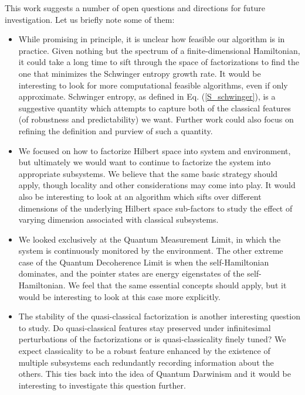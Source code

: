 \documentclass[aps,pra,onecolumn,nofootinbib,11pt,tightenlines]{revtex4-1}
\begin{document}
This work suggests a number of open questions and directions for future investigation.
Let us briefly note some of them:
\begin{itemize}
\item{While promising in principle, it is unclear how feasible our algorithm is in practice. Given nothing but the spectrum of a finite-dimensional Hamiltonian, it could take a long time to sift through the space of factorizations to find the one that minimizes the Schwinger entropy growth rate. It would be interesting to look for more computational feasible algorithms, even if only approximate. Schwinger entropy, as defined in Eq. (\ref{S_schwinger}), is a suggestive quantity which attempts to capture both of the classical features (of robustness and predictability) we want. Further work could also focus on refining the definition and purview of such a quantity.}
\item{We focused on how to factorize Hilbert space into system and environment, but ultimately we would want to continue to factorize the system into appropriate subsystems. We believe that the same basic strategy should apply, though locality and other considerations may come into play. It would also be interesting to look at an algorithm which sifts over different dimensions of the underlying Hilbert space sub-factors to study the effect of varying dimension associated with classical subsystems.}
\item{We looked exclusively at the Quantum Measurement Limit, in which the system is continuously monitored by the environment. The other extreme case of the Quantum Decoherence Limit is when the self-Hamiltonian dominates, and the pointer states are energy eigenstates of the self-Hamiltonian. We feel that the same essential concepts should apply, but it would be interesting to look at this case more explicitly.}
\item{The stability of the quasi-classical factorization is another interesting question to study. Do quasi-classical features stay preserved under infinitesimal perturbations of the factorizations or is quasi-classicality finely tuned? We expect classicality to be a robust feature enhanced by the existence of multiple subsystems each redundantly recording information about the others. This ties back into the idea of Quantum Darwinism \cite{riedel2012} and it would be interesting to investigate this question further. }
\end{itemize}
\end{document}
